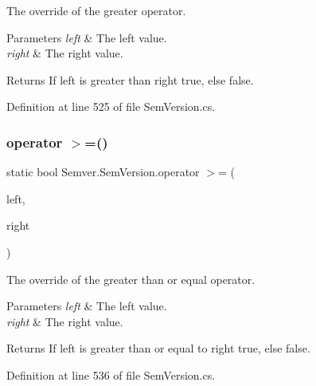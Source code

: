 The override of the greater operator. 


\begin{DoxyParams}{Parameters}
{\em left} & The left value.\\
\hline
{\em right} & The right value.\\
\hline
\end{DoxyParams}
\begin{DoxyReturn}{Returns}
If left is greater than right {\ttfamily true}, else {\ttfamily false}.
\end{DoxyReturn}


Definition at line 525 of file Sem\+Version.\+cs.

\mbox{\label{class_semver_1_1_sem_version_a9bb9a799d7f3292569ec3ed2e7a95c56}} 
\subsubsection{\texorpdfstring{operator $>$=()}{operator >=()}}
{\footnotesize\ttfamily static bool Semver.\+Sem\+Version.\+operator $>$= (\begin{DoxyParamCaption}\item[{\mbox{\hyperlink{class_semver_1_1_sem_version}{Sem\+Version}}}]{left,  }\item[{\mbox{\hyperlink{class_semver_1_1_sem_version}{Sem\+Version}}}]{right }\end{DoxyParamCaption})\hspace{0.3cm}{\ttfamily [static]}}



The override of the greater than or equal operator. 


\begin{DoxyParams}{Parameters}
{\em left} & The left value.\\
\hline
{\em right} & The right value.\\
\hline
\end{DoxyParams}
\begin{DoxyReturn}{Returns}
If left is greater than or equal to right {\ttfamily true}, else {\ttfamily false}.
\end{DoxyReturn}


Definition at line 536 of file Sem\+Version.\+cs.

\mbox{\label{class_semver_1_1_sem_version_a2d0eef22f96f4ed95c48b851363c58d5}} 
